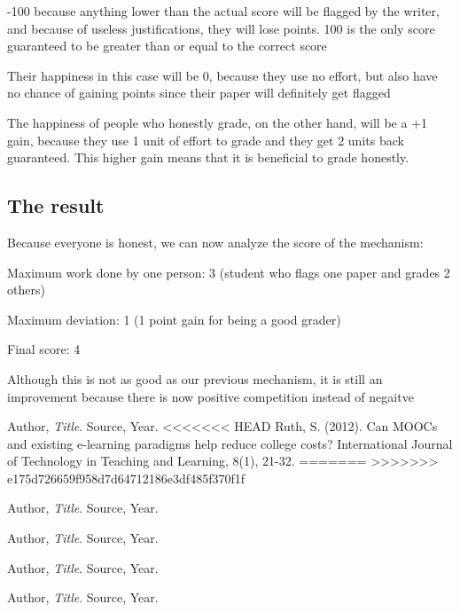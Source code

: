 \documentclass[12pt, Helvetica]{article}
\begin{document}
-100 because anything lower than the actual score will be flagged by the writer, and because of useless justifications, they will lose points. 100 is the only score guaranteed to be greater than or equal to the correct score

Their happiness in this case will be 0, because they use no effort, but also have no chance of gaining points since their paper will definitely get flagged

The happiness of people who honestly grade, on the other hand, will be a +1 gain, because they use 1 unit of effort to grade and they get 2 units back guaranteed. This higher gain means that it is beneficial to grade honestly.

\subsection{The result}
Because everyone is honest, we can now analyze the score of the mechanism:

Maximum work done by one person: 3 (student who flags one paper and grades 2 others)

Maximum deviation: 1 (1 point gain for being a good grader)

Final score: 4

Although this is not as good as our previous mechanism, it is still an improvement because there is now positive competition instead of negaitve

\begin{thebibliography}{9}

  Author,
  \emph{Title}.
  Source,
  Year.
<<<<<<< HEAD
  Ruth, S. (2012). Can MOOCs and existing e-learning paradigms help reduce college costs? International Journal of Technology in Teaching and Learning, 8(1), 21-32.
=======
>>>>>>> e175d726659f958d7d64712186e3df485f370f1f

  Author,
  \emph{Title}.
  Source,
  Year.

  Author,
  \emph{Title}.
  Source,
  Year.

  Author,
  \emph{Title}.
  Source,
  Year.

  Author,
  \emph{Title}.
  Source,
  Year.

\end{thebibliography}
\end{document}
